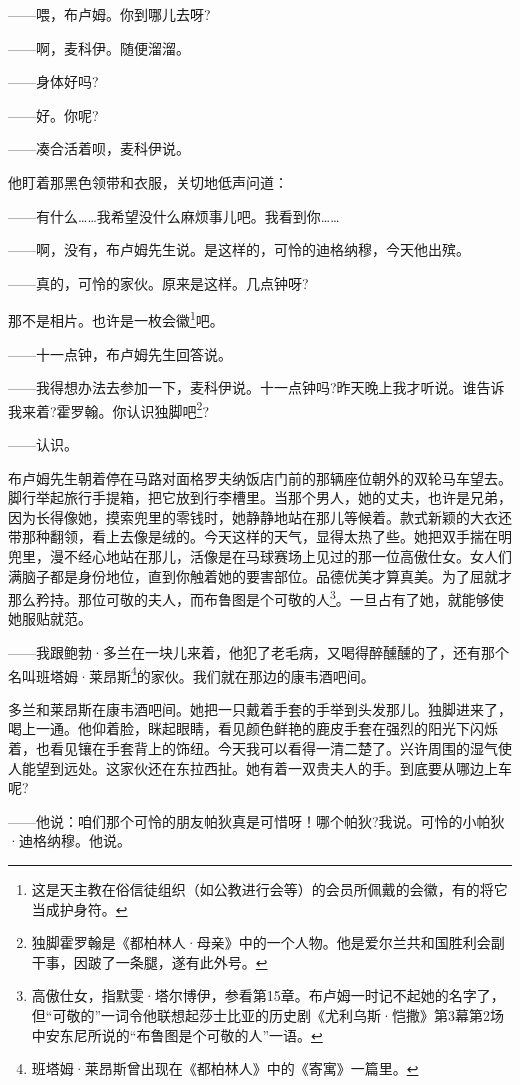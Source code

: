 \par ——喂，布卢姆。你到哪儿去呀?
\par ——啊，麦科伊。随便溜溜。
\par ——身体好吗?
\par ——好。你呢?
\par ——凑合活着呗，麦科伊说。
\par 他盯着那黑色领带和衣服，关切地低声问道：
\par ——有什么……我希望没什么麻烦事儿吧。我看到你……
\par ——啊，没有，布卢姆先生说。是这样的，可怜的迪格纳穆，今天他出殡。
\par ——真的，可怜的家伙。原来是这样。几点钟呀?
\par 那不是相片。也许是一枚会徽\footnote{这是天主教在俗信徒组织（如公教进行会等）的会员所佩戴的会徽，有的将它当成护身符。}吧。
\par ——十一点钟，布卢姆先生回答说。
\par ——我得想办法去参加一下，麦科伊说。十一点钟吗?昨天晚上我才听说。谁告诉我来着?霍罗翰。你认识独脚吧\footnote{独脚霍罗翰是《都柏林人·母亲》中的一个人物。他是爱尔兰共和国胜利会副干事，因跛了一条腿，遂有此外号。}?
\par ——认识。
\par 布卢姆先生朝着停在马路对面格罗夫纳饭店门前的那辆座位朝外的双轮马车望去。脚行举起旅行手提箱，把它放到行李槽里。当那个男人，她的丈夫，也许是兄弟，因为长得像她，摸索兜里的零钱时，她静静地站在那儿等候着。款式新颖的大衣还带那种翻领，看上去像是绒的。今天这样的天气，显得太热了些。她把双手揣在明兜里，漫不经心地站在那儿，活像是在马球赛场上见过的那一位高傲仕女。女人们满脑子都是身份地位，直到你触着她的要害部位。品德优美才算真美。为了屈就才那么矜持。那位可敬的夫人，而布鲁图是个可敬的人\footnote{高傲仕女，指默雯·塔尔博伊，参看第15章。布卢姆一时记不起她的名字了，但“可敬的”一词令他联想起莎士比亚的历史剧《尤利乌斯·恺撒》第3幕第2场中安东尼所说的“布鲁图是个可敬的人”一语。}。一旦占有了她，就能够使她服贴就范。
\par ——我跟鲍勃·多兰在一块儿来着，他犯了老毛病，又喝得醉醺醺的了，还有那个名叫班塔姆·莱昂斯\footnote{班塔姆·莱昂斯曾出现在《都柏林人》中的《寄寓》一篇里。}的家伙。我们就在那边的康韦酒吧间。
\par 多兰和莱昂斯在康韦酒吧间。她把一只戴着手套的手举到头发那儿。独脚进来了，喝上一通。他仰着脸，眯起眼睛，看见颜色鲜艳的鹿皮手套在强烈的阳光下闪烁着，也看见镶在手套背上的饰纽。今天我可以看得一清二楚了。兴许周围的湿气使人能望到远处。这家伙还在东拉西扯。她有着一双贵夫人的手。到底要从哪边上车呢?
\par ——他说：咱们那个可怜的朋友帕狄真是可惜呀！哪个帕狄?我说。可怜的小帕狄·迪格纳穆。他说。
